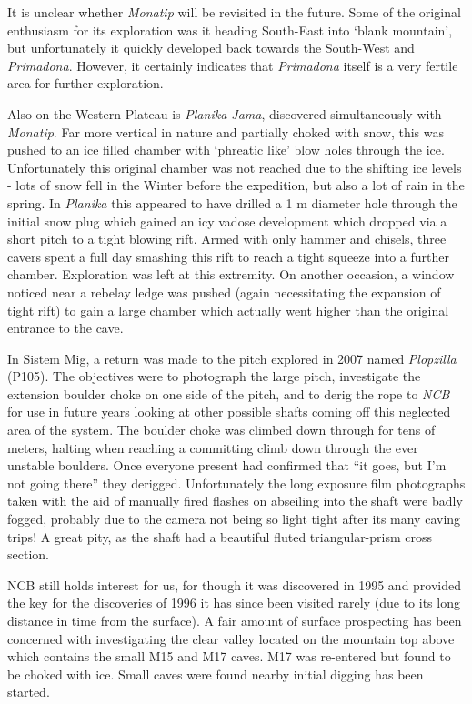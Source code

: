 It is unclear whether \emph{Monatip} will be revisited in the future.
Some of the original enthusiasm for its exploration was it heading
South-East into `blank mountain', but unfortunately it quickly developed
back towards the South-West and \emph{Primadona}. However, it certainly
indicates that \emph{Primadona} itself is a very fertile area for
further exploration.

Also on the Western Plateau is \emph{Planika Jama}, discovered
simultaneously with \emph{Monatip}. Far more vertical in nature and
partially choked with snow, this was pushed to an ice filled chamber
with `phreatic like' blow holes through the ice. Unfortunately this
original chamber was not reached due to the shifting ice levels - lots
of snow fell in the Winter before the expedition, but also a lot of rain
in the spring. In \emph{Planika} this appeared to have drilled a 1 m
diameter hole through the initial snow plug which gained an icy vadose
development which dropped via a short pitch to a tight blowing rift.
Armed with only hammer and chisels, three cavers spent a full day
smashing this rift to reach a tight squeeze into a further chamber.
Exploration was left at this extremity. On another occasion, a window
noticed near a rebelay ledge was pushed (again necessitating the
expansion of tight rift) to gain a large chamber which actually went
higher than the original entrance to the cave.

In Sistem Mig, a return was made to the pitch explored in 2007 named
\emph{Plopzilla} (P105). The objectives were to photograph the large
pitch, investigate the extension boulder choke on one side of the pitch,
and to derig the rope to \emph{NCB} for use in future years looking at
other possible shafts coming off this neglected area of the system. The
boulder choke was climbed down through for tens of meters, halting when
reaching a committing climb down through the ever unstable boulders.
Once everyone present had confirmed that ``it goes, but I'm not going
there'' they derigged. Unfortunately the long exposure film photographs
taken with the aid of manually fired flashes on abseiling into the shaft
were badly fogged, probably due to the camera not being so light tight
after its many caving trips! A great pity, as the shaft had a beautiful
fluted triangular-prism cross section.

NCB still holds interest for us, for though it was discovered in 1995
and provided the key for the discoveries of 1996 it has since been
visited rarely (due to its long distance in time from the surface). A
fair amount of surface prospecting has been concerned with investigating
the clear valley located on the mountain top above which contains the
small M15 and M17 caves. M17 was re-entered but found to be choked with
ice. Small caves were found nearby initial digging has been started.

